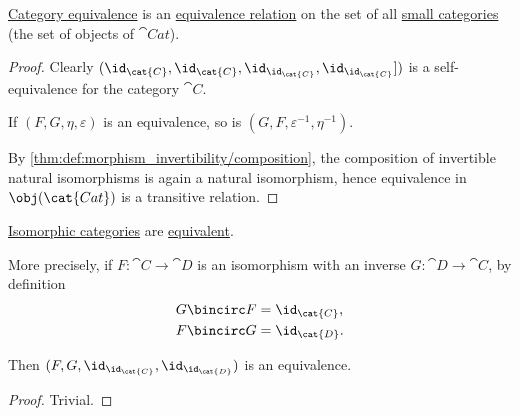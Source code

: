\begin{proposition}\label{thm:category_equivalence_is_equivalence_relation}
  \hyperref[def:equivalence_of_categories]{Category equivalence} is an \hyperref[def:equivalence_relation]{equivalence relation} on the set of all \hyperref[def:small_category]{small categories} (the set of objects of \hyperref[def:category_of_small_categories]{\( \cat{Cat} \)}).
\end{proposition}
\begin{proof}
   Clearly \( (\id_{\cat{C}}, \id_{\cat{C}}, \id_{\id_{\cat{C}}}, \id_{\id_{\cat{C}}}]) \) is a self-equivalence for the category \( \cat{C} \).

   If \( (F, G, \eta, \varepsilon) \) is an equivalence, so is \( (G, F, \varepsilon^{-1}, \eta^{-1}) \).

   By \cref{thm:def:morphism_invertibility/composition}, the composition of invertible natural isomorphisms is again a natural isomorphism, hence equivalence in \( \obj(\cat{Cat}) \) is a transitive relation.
\end{proof}

\begin{proposition}\label{thm:category_isomorphism_is_equivalence}
  \hyperref[def:isomorphism_of_categories]{Isomorphic categories} are \hyperref[def:equivalence_of_categories]{equivalent}.

  More precisely, if \( F: \cat{C} \to \cat{D} \) is an isomorphism with an inverse \( G: \cat{D} \to \cat{C} \), by definition
  \begin{align*}
    G \bincirc F &= \id_{\cat{C}}, \\
    F \bincirc G &= \id_{\cat{D}}.
  \end{align*}

  Then \( (F, G, \id_{\id_{\cat{C}}}, \id_{\id_{\cat{D}}}) \) is an equivalence.
\end{proposition}
\begin{proof}
  Trivial.
\end{proof}

